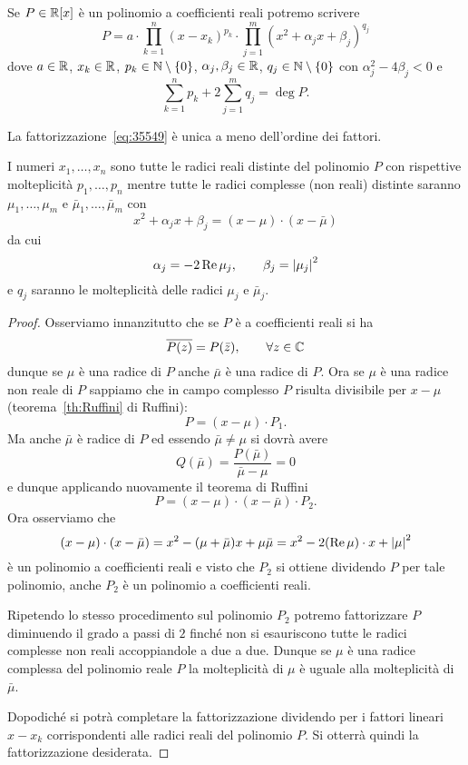 \begin{theorem}
  \label{th:fattorizzazione_polinomio_reale}%
Se $P\in {\mathbb R}[x]$ è un polinomio a coefficienti reali
potremo scrivere
\begin{equation}\label{eq:35549}
  P = a \cdot \prod_{k=1}^n (x-x_k)^{p_k} \cdot \prod_{j=1}^m (x^2 + \alpha_j x + \beta_j)^{q_j}
\end{equation}
dove $a\in {\mathbb R}$, $x_k\in {\mathbb R}$, $p_k\in {\mathbb N}\setminus{\left\{ 0 \right\}}$,
$\alpha_j,\beta_j\in {\mathbb R}$, $q_j\in {\mathbb N}\setminus{\left\{ 0 \right\}}$
con $\alpha_j^2 - 4 \beta_j < 0$
e
\[
  \sum_{k=1}^n p_k + 2 \sum_{j=1}^m q_j = \deg P.
\]

La fattorizzazione~\eqref{eq:35549} è unica a meno
dell'ordine dei fattori.

I numeri $x_1,\dots,x_n$ sono tutte le radici reali distinte
del polinomio $P$ con rispettive molteplicità
$p_1,\dots,p_n$ mentre tutte le radici complesse (non reali)
distinte saranno $\mu_1,\dots, \mu_m$
e $\bar \mu_1, \dots, \bar \mu_m$ con
\[
  x^2 + \alpha_j x + \beta_j = (x-\mu)\cdot(x-\bar \mu)
\]
da cui
\[
  \alpha_j = -2\operatorname{Re} \mu_j, \qquad \beta_j={\left|\mu_j\right|}^2
\]
e $q_j$ saranno le molteplicità delle radici $\mu_j$
 e $\bar \mu_j$.
\end{theorem}
%
\begin{proof}
Osserviamo innanzitutto che se $P$ è a coefficienti reali
si ha
\[
  \overline{P(z)} = P(\bar z), \qquad \forall z\in {\mathbb C}
\]
dunque se $\mu$ è una radice di $P$ anche $\bar \mu$
è una radice di $P$.
Ora se $\mu$ è una radice non reale di $P$ sappiamo
che in campo complesso $P$ risulta divisibile
per $x-\mu$ (teorema~\ref{th:Ruffini} di Ruffini):
\[
  P = (x-\mu) \cdot P_1.
\]
Ma anche $\bar \mu$ è radice di $P$ ed essendo
$\bar \mu \neq \mu$ si dovrà avere
\[
Q(\bar \mu) = \frac{P(\bar \mu)}{\bar \mu - \mu} = 0
\]
e dunque applicando nuovamente il teorema di Ruffini
\[
 P = (x-\mu)\cdot (x-\bar \mu)\cdot P_2.
\]
Ora osserviamo che
\[
(x-\mu)\cdot(x-\bar \mu) = x^2 - (\mu + \bar \mu) x + \mu \bar \mu
 = x^2 - 2 (\operatorname{Re} \mu)\cdot x + {\left|\mu\right|}^2
\]
è un polinomio a coefficienti reali e
visto che $P_2$ si ottiene dividendo $P$ per tale polinomio,
anche $P_2$ è un polinomio a coefficienti reali.

Ripetendo lo stesso procedimento sul polinomio $P_2$
potremo fattorizzare $P$ diminuendo il grado a passi
di $2$ finché non si esauriscono tutte le radici complesse
non reali accoppiandole a due a due.
Dunque se $\mu$ è una radice complessa
del polinomio reale $P$ la molteplicità di $\mu$ è
uguale alla molteplicità di $\bar \mu$.

Dopodiché
si potrà completare la fattorizzazione dividendo
per i fattori lineari $x-x_k$ corrispondenti
alle radici reali del polinomio $P$.
Si otterrà quindi la fattorizzazione desiderata.
\end{proof}


